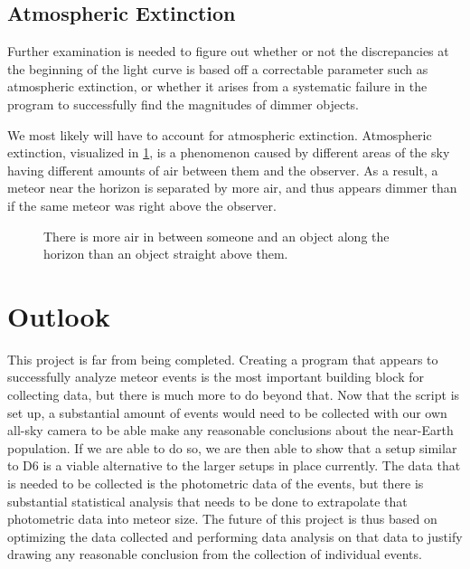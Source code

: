 \subsection{Atmospheric Extinction}
Further examination is needed to figure out whether or not the discrepancies at the beginning of the light curve is based off a correctable parameter such as atmospheric extinction, or whether it arises from a systematic failure in the program to successfully find the magnitudes of dimmer objects.

We most likely will have to account for atmospheric extinction. Atmospheric extinction, visualized in \ref{fig:extinction}, is a phenomenon caused by different areas of the sky having different amounts of air between them and the observer. As a result, a meteor near the horizon is separated by more air, and thus appears dimmer than if the same meteor was right above the observer. 
\begin{figure}[ht!]
	\centering
	\caption{There is more air in between someone and an object along the horizon than an object straight above them.}
	\label{fig:extinction}
\end{figure}


\section{Outlook}
This project is far from being completed. Creating a program that appears to successfully analyze meteor events is the most important building block for collecting data, but there is much more to do beyond that. Now that the script is set up, a substantial amount of events would need to be collected with our own all-sky camera to be able make any reasonable conclusions about the near-Earth population. If we are able to do so, we are then able to show that a setup similar to D6 is a viable alternative to the larger setups in place currently.  The data that is needed to be collected is the photometric data of the events, but there is substantial statistical analysis that needs to be done to extrapolate that photometric data into meteor size. The future of this project is thus based on optimizing the data collected and performing data analysis on that data to justify drawing any reasonable conclusion from the collection of individual events.
